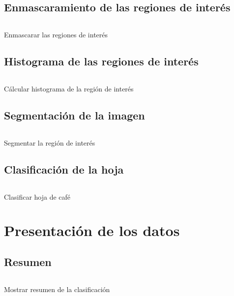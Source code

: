 \subsection{Enmascaramiento de las regiones de interés}
\begin{listing}[!ht]
\inputminted{python}{code_listings/masked_roi.py}
\caption{Enmascarar las regiones de interés}
\label{code:masked_roi}
\end{listing}

\subsection{Histograma de las regiones de interés}
\begin{listing}[!ht]
\inputminted{python}{code_listings/histogram.py}
\caption{Cálcular histograma de la región de interés}
\label{code:histogram}
\end{listing}

\subsection{Segmentación de la imagen}
\begin{listing}[!ht]
\inputminted{python}{code_listings/segmentation.py}
\caption{Segmentar la región de interés}
\label{code:segmentation}
\end{listing}

\subsection{Clasificación de la hoja}
\begin{listing}[!ht]
\inputminted{python}{code_listings/categorize.py}
\caption{Clasificar hoja de café}
\label{code:categorize}
\end{listing}

\section{Presentación de los datos}

\subsection{Resumen}
\begin{listing}[!ht]
\inputminted{python}{code_listings/show_summary.py}
\caption{Mostrar resumen de la clasificación}
\label{code:show_summary}
\end{listing}

